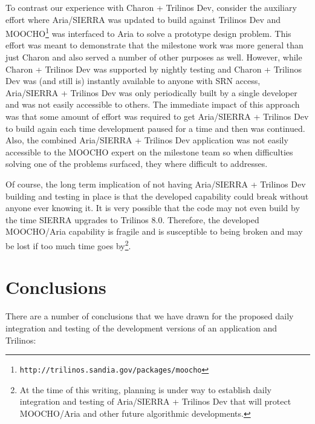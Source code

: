 \documentclass[pdf,ps2pdf,11pt]{SANDreport}
\begin{document}
To contrast our experience with Charon + Trilinos Dev, consider the auxiliary
effort where Aria/SIERRA was updated to build against Trilinos Dev and
MOOCHO\footnote{{}\texttt{http://trilinos.sandia.gov/packages/moocho}} was
interfaced to Aria to solve a prototype design problem.  This effort was meant
to demonstrate that the milestone work was more general than just Charon and
also served a number of other purposes as well.  However, while Charon +
Trilinos Dev was supported by nightly testing and Charon + Trilinos Dev was
(and still is) instantly available to anyone with SRN access, Aria/SIERRA +
Trilinos Dev was only periodically built by a single developer and was not
easily accessible to others.  The immediate impact of this approach was that
some amount of effort was required to get Aria/SIERRA + Trilinos Dev to build
again each time development paused for a time and then was continued.  Also,
the combined Aria/SIERRA + Trilinos Dev application was not easily accessible
to the MOOCHO expert on the milestone team so when difficulties solving one of
the problems surfaced, they where difficult to addresses.

Of course, the long term implication of not having Aria/SIERRA + Trilinos Dev
building and testing in place is that the developed capability could break
without anyone ever knowing it.  It is very possible that the code may not
even build by the time SIERRA upgrades to Trilinos 8.0.  Therefore, the
developed MOOCHO/Aria capability is fragile and is susceptible to being broken
and may be lost if too much time goes by\footnote{At the time of this writing,
planning is under way to establish daily integration and testing of
Aria/SIERRA + Trilinos Dev that will protect MOOCHO/Aria and other future
algorithmic developments.}.


%
\section{Conclusions}
%

There are a number of conclusions that we have drawn for the proposed daily
integration and testing of the development versions of an application and
Trilinos:
\end{document}
